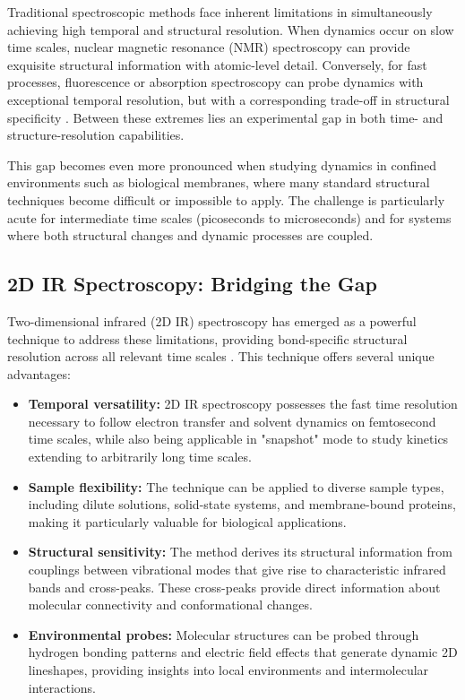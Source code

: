 \noindent Traditional spectroscopic methods face inherent limitations in simultaneously achieving high temporal and structural resolution. When dynamics occur on slow time scales, nuclear magnetic resonance (NMR) spectroscopy can provide exquisite structural information with atomic-level detail. Conversely, for fast processes, fluorescence or absorption spectroscopy can probe dynamics with exceptional temporal resolution, but with a corresponding trade-off in structural specificity \cite{HammZanni2011ConceptsMethods2D}. Between these extremes lies an experimental gap in both time- and structure-resolution capabilities.

\noindent This gap becomes even more pronounced when studying dynamics in confined environments such as biological membranes, where many standard structural techniques become difficult or impossible to apply. The challenge is particularly acute for intermediate time scales (picoseconds to microseconds) and for systems where both structural changes and dynamic processes are coupled.

\subsection{2D IR Spectroscopy: Bridging the Gap}
\label{subsec:2dir_bridging_gap}

\noindent Two-dimensional infrared (2D IR) spectroscopy has emerged as a powerful technique to address these limitations, providing bond-specific structural resolution across all relevant time scales \cite{HammZanni2011ConceptsMethods2D}. This technique offers several unique advantages:

\begin{itemize}
    \item \textbf{Temporal versatility:} 2D IR spectroscopy possesses the fast time resolution necessary to follow electron transfer and solvent dynamics on femtosecond time scales, while also being applicable in "snapshot" mode to study kinetics extending to arbitrarily long time scales.

    \item \textbf{Sample flexibility:} The technique can be applied to diverse sample types, including dilute solutions, solid-state systems, and membrane-bound proteins, making it particularly valuable for biological applications.

    \item \textbf{Structural sensitivity:} The method derives its structural information from couplings between vibrational modes that give rise to characteristic infrared bands and cross-peaks. These cross-peaks provide direct information about molecular connectivity and conformational changes.

    \item \textbf{Environmental probes:} Molecular structures can be probed through hydrogen bonding patterns and electric field effects that generate dynamic 2D lineshapes, providing insights into local environments and intermolecular interactions.
\end{itemize}

